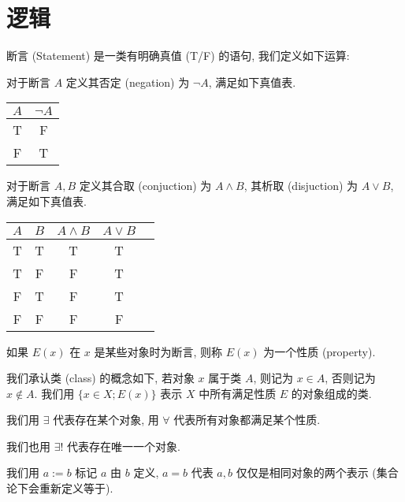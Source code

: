 \section{逻辑}

断言 (Statement) 是一类有明确真值 (T/F) 的语句, 我们定义如下运算:

\begin{definition}
    对于断言 \(A\) 定义其否定 (negation) 为 \(\neg A\), 满足如下真值表.
    \begin{center}
        \begin{tabular}{|c|c|}
            \hline
            \(A\) & \(\neg A\) \\
            \hline
            T & F \\
            \hline
            F & T \\
            \hline
        \end{tabular}
    \end{center}

    对于断言 \(A, B\) 定义其合取 (conjuction) 为 \(A \land B\), 其析取 (disjuction) 为 \(A \lor B\), 满足如下真值表.

    \begin{center}
        \begin{tabular}{|c|c|c|c|c|}
            \hline
            \(A\) & \(B\) & \(A \land B\) & \(A \lor B\) \\
            \hline
            T & T & T & T \\
            \hline
            T & F & F & T \\
            \hline
            F & T & F & T \\
            \hline
            F & F & F & F \\
            \hline
        \end{tabular}
    \end{center}
\end{definition}

\begin{definition}
    如果 \(E(x)\) 在 \(x\) 是某些对象时为断言, 则称 \(E(x)\) 为一个性质 (property).
\end{definition}

我们承认类 (class) 的概念如下, 若对象 \(x\) 属于类 \(A\), 则记为 \(x \in A\), 否则记为 \(x \notin A\).
我们用 \(\{x \in X; E(x)\}\) 表示 \(X\) 中所有满足性质 \(E\) 的对象组成的类.

\begin{definition}
    我们用 \(\exists\) 代表存在某个对象, 用 \(\forall\) 代表所有对象都满足某个性质.

    我们也用 \(\exists !\) 代表存在唯一一个对象.

    我们用 \(a := b\) 标记 \(a\) 由 \(b\) 定义, \(a = b\) 代表 \(a, b\) 仅仅是相同对象的两个表示 (集合论下会重新定义等于).
\end{definition}

